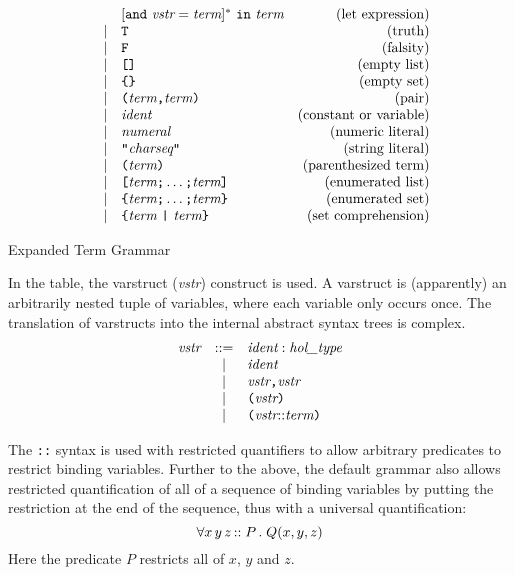 {\begin{table}
\[\begin{array}{rclr}
    &   & [\und\ \vstr = \term]^{*}\ \IN\ \term & \mbox{(let expression)} \\
    & | & \verb+T+ & \mbox{(truth)} \\
    & | & \verb+F+ & \mbox{(falsity)} \\
    & | & \verb+[]+ & \mbox{(empty list)} \\
    & | & \verb+{}+ & \mbox{(empty set)} \\
    & | & \verb+(+ \term \verb+,+ \term \verb+)+ & \mbox{(pair)} \\
    & | & \ident & \mbox{(constant or variable)} \\
    & | & \numeral & \mbox{(numeric literal)} \\
    & | & \verb+"+\charseq \verb+"+& \mbox{(string literal)} \\
    & | & \verb+(+ \term \verb+)+ & \mbox{(parenthesized term)} \\
    & | & \verb+[+ \term \verb+;+ \ldots \verb+;+ \term \verb+]+ &
    \mbox{(enumerated list)} \\
    & | & \verb+{+ \term \verb+;+ \ldots \verb+;+ \term \verb+}+ &
    \mbox{(enumerated set)} \\
    & | & \verb+{+ \term \ \verb+|+\  \term \verb+}+ & \mbox{(set comprehension)}
  \end{array}
  \]
  \caption{Expanded Term Grammar} \label{expanded-grammar}
\end{table}

In the table, the varstruct ({\it vstr\/}) construct is used. A
varstruct is (apparently) an arbitrarily nested tuple of variables,
where each variable only occurs once. The translation of varstructs
into the internal abstract syntax trees is complex.
\[
\begin{array}{rcl}
  \vstr & ::= & \ident : \type \\
  & | & \ident  \\
  & | & \vstr \verb+,+ \vstr \\
  & | & \verb+(+ \vstr \verb+)+\\
  & | & \verb+(+\vstr {\tt ::} \term\verb+)+\\
\end{array}
\]

The \texttt{::} syntax is used with restricted quantifiers to allow
arbitrary predicates to restrict binding variables.  Further to the
above, the default grammar also allows restricted quantification of
all of a sequence of binding variables by putting the restriction at
the end of the sequence, thus with a universal quantification: \[
\forall x \, y \, z \, {\tt ::} \; P \, . \; Q(x,y,z)
\] Here the predicate $P$ restricts all of $x$, $y$ and $z$.

}
